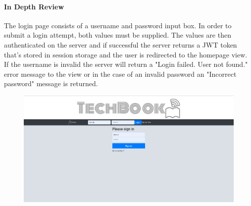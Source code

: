 \paragraph{In Depth Review\newline}
The login page consists of a username and password input box. In order to submit a login attempt, both values must be supplied. The values are then authenticated on the server and if successful the server returns a JWT token that's stored in session storage and the user is redirected to the homepage view.  If the username is invalid the server will return a "Login failed. User not found." error message to the view or in the case of an invalid password an "Incorrect password" message is returned.
\begin{figure}[H]
\centering
\begin{minipage}{.75\textwidth}
  \centering
  \includegraphics[width=.9\linewidth]{img/ui/login_PC.PNG}
  \label{fig:loginPC}
\end{minipage}%
\begin{minipage}{.25\textwidth}
  \centering

\end{minipage}
\end{figure}
